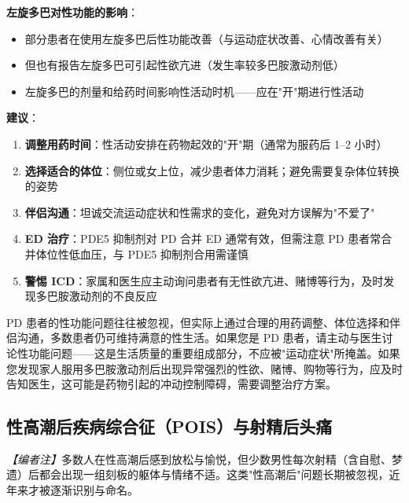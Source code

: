\vspace{0.5em}
\noindent\textbf{左旋多巴对性功能的影响}：

\begin{itemize}[leftmargin=2cm]
	\item 部分患者在使用左旋多巴后性功能改善（与运动症状改善、心情改善有关）
	\item 但也有报告左旋多巴可引起性欲亢进（发生率较多巴胺激动剂低）
	\item 左旋多巴的剂量和给药时间影响性活动时机——应在"开"期进行性活动
\end{itemize}

\vspace{0.5em}
\noindent\textbf{建议}：

\begin{enumerate}
	\item \textbf{调整用药时间}：性活动安排在药物起效的"开"期（通常为服药后 1--2 小时）
	\item \textbf{选择适合的体位}：侧位或女上位，减少患者体力消耗；避免需要复杂体位转换的姿势
	\item \textbf{伴侣沟通}：坦诚交流运动症状和性需求的变化，避免对方误解为"不爱了"
	\item \textbf{ED 治疗}：PDE5 抑制剂对 PD 合并 ED 通常有效，但需注意 PD 患者常合并体位性低血压，与 PDE5 抑制剂合用需谨慎
	\item \textbf{警惕 ICD}：家属和医生应主动询问患者有无性欲亢进、赌博等行为，及时发现多巴胺激动剂的不良反应
\end{enumerate}

\begin{tcolorbox}[colback=pink!5!white,colframe=red!50!black,title=贴心小叮咛]
PD 患者的性功能问题往往被忽视，但实际上通过合理的用药调整、体位选择和伴侣沟通，多数患者仍可维持满意的性生活。如果您是 PD 患者，请主动与医生讨论性功能问题——这是生活质量的重要组成部分，不应被"运动症状"所掩盖。如果您发现家人服用多巴胺激动剂后出现异常强烈的性欲、赌博、购物等行为，应及时告知医生，这可能是药物引起的冲动控制障碍，需要调整治疗方案。
\end{tcolorbox}

\subsection{性高潮后疾病综合征（POIS）与射精后头痛}
\label{subsec:pois}

\noindent\textit{【编者注】}多数人在性高潮后感到放松与愉悦，但少数男性每次射精（含自慰、梦遗）后都会出现一组刻板的躯体与情绪不适。这类"性高潮后"问题长期被忽视，近年来才被逐渐识别与命名。

